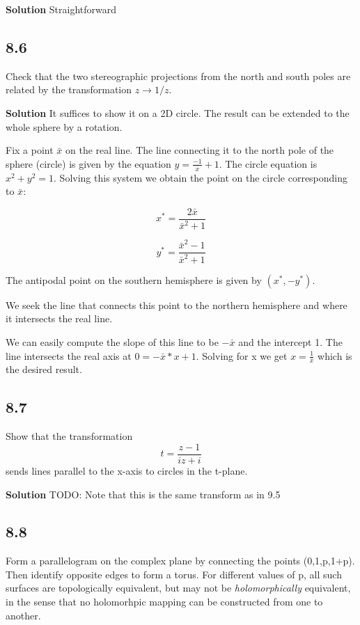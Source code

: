 \documentclass[]{article}
\begin{document}
\textbf{Solution}
Straightforward

\subsection*{8.6}
Check that the two stereographic projections from the north and south poles are related by the transformation $z \rightarrow 1/z$.

\textbf{Solution}
It suffices to show it on a 2D circle. The result can be extended to the whole sphere by a rotation.

Fix a point $\bar{x}$ on the real line.  
The line connecting it to the north pole of the sphere (circle) is given by the equation $y = \frac{-1}{\bar{x}} +1$.
The circle equation is $x^2+y^2 = 1$.
Solving this system we obtain the point on the circle corresponding to $\bar{x}$:

\begin{equation}
x^* = \frac{2\bar{x}}{\bar{x}^2+1}
\end{equation}


\begin{equation}
y^* = \frac{\bar{x}^2-1}{\bar{x}^2+1}
\end{equation}

The antipodal point on the southern hemisphere is given by 
$(x^*, -y^*)$.

We seek the line that connects this point to the northern hemisphere and where it intersects the real line.

We can easily compute the slope of this line to be 
$-\bar{x}$ and the intercept 1. The line intersects the real axis at $0 = -\bar{x}*x + 1$.
Solving for x we get $x = \frac{1}{\bar{x}}$ which is the desired result.


\subsection*{8.7}
Show that the transformation 
$$
t = \frac{z-1}{iz+i}
$$
sends lines parallel to the x-axis to circles in the t-plane.

\textbf{Solution}
TODO: Note that this is the same transform as in  9.5



\subsection*{8.8}
Form a parallelogram on the complex plane by connecting the points (0,1,p,1+p). Then identify opposite edges to form a torus. For different values of p, all such surfaces are topologically equivalent, but may not be \textit{holomorphically} equivalent, in the sense that no holomorhpic mapping can be constructed from one to another.
\end{document}
